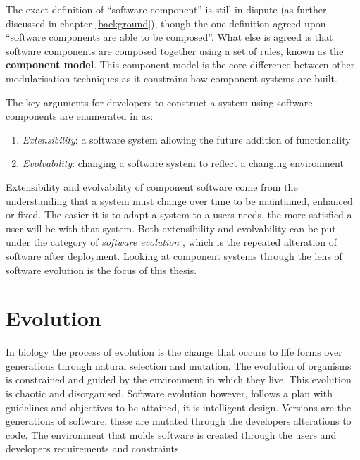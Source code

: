 The exact definition of ``software component'' is still in dispute (as further discussed in chapter \ref{background}),
though the one definition agreed upon ``software components are able to be composed''.
What else is agreed is that software components are composed together using a set of rules, known as the \textbf{component model}.
This component model is the core difference between other modularisation techniques as it constrains how component systems are built.

The key arguments for developers to construct a system using software components are enumerated in \cite{Szyperski2000} as:
\begin{enumerate}
	\item \textit{Extensibility}: a software system allowing the future addition of functionality
	\item \textit{Evolvability}: changing a software system to reflect a changing environment
\end{enumerate}

Extensibility and evolvability of component software come from the understanding that a system must change over time to be maintained, enhanced or fixed.
The easier it is to adapt a system to a users needs, the more satisfied a user will be with that system.
Both extensibility and evolvability can be put under the category of \textit{software evolution} \citep{lehman1980}, which is the repeated alteration of software after deployment.
Looking at component systems through the lens of software evolution is the focus of this thesis.

\section{Evolution}
In biology the process of evolution is the change that occurs to life forms over generations through natural selection and mutation.
The evolution of organisms is constrained and guided by the environment in which they live.
This evolution is chaotic and disorganised.
Software evolution however, follows a plan with guidelines and objectives to be attained, it is intelligent design.
Versions are the generations of software, these are mutated through the developers alterations to code.
The environment that molds software is created through the users and developers requirements and constraints.

